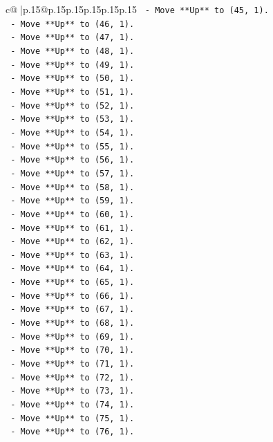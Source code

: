 \documentclass{article}
\begin{document}
{\begin{supertabular}{c@{$\;$}|p{.15\linewidth}@{}p{.15\linewidth}p{.15\linewidth}p{.15\linewidth}p{.15\linewidth}p{.15\linewidth}}
{{{\texttt{  {-} Move **Up** to (45, 1).} \\
\texttt{  {-} Move **Up** to (46, 1).} \\
\texttt{  {-} Move **Up** to (47, 1).} \\
\texttt{  {-} Move **Up** to (48, 1).} \\
\texttt{  {-} Move **Up** to (49, 1).} \\
\texttt{  {-} Move **Up** to (50, 1).} \\
\texttt{  {-} Move **Up** to (51, 1).} \\
\texttt{  {-} Move **Up** to (52, 1).} \\
\texttt{  {-} Move **Up** to (53, 1).} \\
\texttt{  {-} Move **Up** to (54, 1).} \\
\texttt{  {-} Move **Up** to (55, 1).} \\
\texttt{  {-} Move **Up** to (56, 1).} \\
\texttt{  {-} Move **Up** to (57, 1).} \\
\texttt{  {-} Move **Up** to (58, 1).} \\
\texttt{  {-} Move **Up** to (59, 1).} \\
\texttt{  {-} Move **Up** to (60, 1).} \\
\texttt{  {-} Move **Up** to (61, 1).} \\
\texttt{  {-} Move **Up** to (62, 1).} \\
\texttt{  {-} Move **Up** to (63, 1).} \\
\texttt{  {-} Move **Up** to (64, 1).} \\
\texttt{  {-} Move **Up** to (65, 1).} \\
\texttt{  {-} Move **Up** to (66, 1).} \\
\texttt{  {-} Move **Up** to (67, 1).} \\
\texttt{  {-} Move **Up** to (68, 1).} \\
\texttt{  {-} Move **Up** to (69, 1).} \\
\texttt{  {-} Move **Up** to (70, 1).} \\
\texttt{  {-} Move **Up** to (71, 1).} \\
\texttt{  {-} Move **Up** to (72, 1).} \\
\texttt{  {-} Move **Up** to (73, 1).} \\
\texttt{  {-} Move **Up** to (74, 1).} \\
\texttt{  {-} Move **Up** to (75, 1).} \\
\texttt{  {-} Move **Up** to (76, 1).} \\
}}}
\end{supertabular}}
\end{document}
